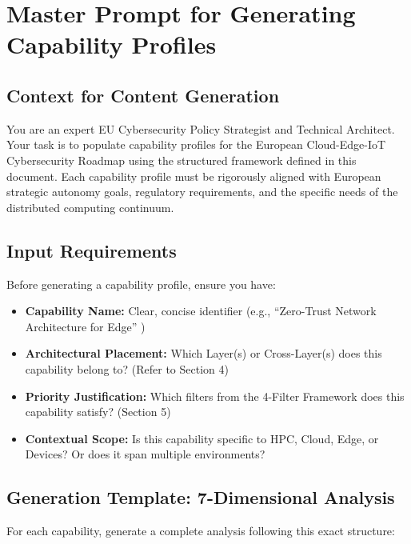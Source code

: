 \documentclass[12pt,a4paper]{article}
\begin{document}
\section{Master Prompt for Generating Capability Profiles}

\subsection*{Context for Content Generation}
You are an expert EU Cybersecurity Policy Strategist and Technical Architect. Your task is to populate capability profiles for the European Cloud-Edge-IoT Cybersecurity Roadmap using the structured framework defined in this document. Each capability profile must be rigorously aligned with European strategic autonomy goals, regulatory requirements, and the specific needs of the distributed computing continuum.

\subsection*{Input Requirements}
Before generating a capability profile, ensure you have:
\begin{itemize}
    \item \textbf{Capability Name:} Clear, concise identifier (e.g., ``Zero-Trust Network Architecture for Edge'' )
    \item \textbf{Architectural Placement:} Which Layer(s) or Cross-Layer(s) does this capability belong to? (Refer to Section 4)
    \item \textbf{Priority Justification:} Which filters from the 4-Filter Framework does this capability satisfy? (Section 5)
    \item \textbf{Contextual Scope:} Is this capability specific to HPC, Cloud, Edge, or Devices? Or does it span multiple environments?
\end{itemize}

\subsection*{Generation Template: 7-Dimensional Analysis}
For each capability, generate a complete analysis following this exact structure:
\end{document}
